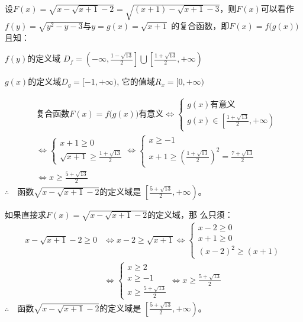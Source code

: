 \begin{solution}
设$F(x)=\sqrt{x-\sqrt{x+1}-2}=\sqrt{(x+1)-\sqrt{x+1}-3}$，则$F(x)$可以看作$f(y)=\sqrt{y^2-y-3}$与$y=g(x)=\sqrt{x+1}$
的复合函数，即$F(x)=f\big(g(x)\big)$且知：

$f(y)$的定义域
$D_f=\left(-\infty,\frac{1-\sqrt{13}}{2}\right]\bigcup\left[\frac{1+\sqrt{13}}{2},+\infty\right)$

$g(x)$的定义域$D_g=[-1,+\infty)$, 它的值域$R_x=[0,+\infty)$

\[\begin{split}
&\text{复合函数$F(x)=f\big(g(x)\big)$有意义}\Longleftrightarrow
\begin{cases}
    g(x)\text{有意义}\\
    g(x)\in\left[\frac{1+\sqrt{13}}{2},+\infty\right)
\end{cases}\\
&\Longleftrightarrow
\begin{cases}
    x+1\ge 0\\
    \sqrt{x+1}\ge \frac{1+\sqrt{13}}{2}
\end{cases}\Longleftrightarrow
\begin{cases}
    x\ge -1\\
    x+1\ge \left(\frac{1+\sqrt{13}}{2}\right)^2=\frac{7+\sqrt{13}}{2}
\end{cases}\\
&\Longleftrightarrow x\ge \frac{5+\sqrt{13}}{2}
\end{split}\]
$\therefore\quad $函数$\sqrt{x-\sqrt{x+1}-2}$的定义域是
$\left[\frac{5+\sqrt{13}}{2},+\infty\right)$。

如果直接求$F(x)=\sqrt{x-\sqrt{x+1}-2}$的定义域，那
么只须：
\[\begin{split}
   x-\sqrt{x+1}-2\ge 0& \Longleftrightarrow x-2\ge \sqrt{x+1} \Longleftrightarrow \begin{cases}
    x-2\ge 0\\ x+1\ge 0\\ (x-2)^2\ge (x+1)
\end{cases}\\
& \Longleftrightarrow \begin{cases}
    x\ge 2\\x\ge -1\\ x\ge \frac{5+\sqrt{13}}{2}
\end{cases} \Longleftrightarrow x\ge \frac{5+\sqrt{13}}{2}
\end{split}\]
$\therefore\quad $函数$\sqrt{x-\sqrt{x+1}-2}$的定义域是
$\left[\frac{5+\sqrt{13}}{2},+\infty\right)$。
\end{solution}

